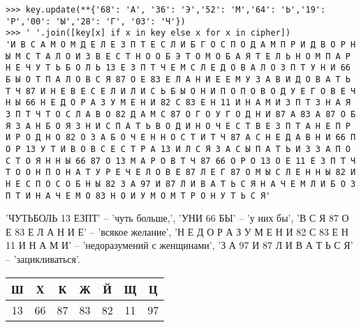\documentclass[letterpaper,11pt,openany]{book}
\begin{document}
\begin{lstlisting}
>>> key.update(**{'68': 'А', '36': 'Э','52': 'М','64': 'Ь','19': 'Р','00': 'Ы','28': 'Г', '03': 'Ч'})
>>> ' '.join([key[x] if x in key else x for x in cipher])
'И В С А М О М Д Е Л Е З П Т Е С Л И Б Г О С П О Д А М П Р И Д В О Р Н Ы М С Т А Л О И З В Е С Т Н О О Б Э Т О М О Б А Я Т Е Л Ь Н О М П А Р Н Е Ч У Т Ь Б О Л Ь 13 Е З П Т Ч Е М С Л Е Д О В А Л О З П Т У Н И 66 Б Ы О Т П А Л О В С Я 87 О Е 83 Е Л А Н И Е Е М У З А В И Д О В А Т Ь Т Ч 87 И Н Е В Е С Е Л И Л И С Ь Б Ы О Н И П О П О В О Д У Е Г О В Е Ч Н Ы 66 Н Е Д О Р А З У М Е Н И 82 С 83 Е Н 11 И Н А М И З П Т З Н А Я З П Т Ч Т О С Л А В О 82 Д А М С 87 О Г О У Г О Д Н И 87 А 83 А 87 О Б Я З А Н Б О Я З Н И С П А Т Ь В О Д И Н О Ч Е С Т В Е З П Т А Н Е П Р И Р О Д Н О 82 О З А Б О Ч Е Н Н О С Т И Т Ч 87 А С Н Е Д А В Н И 66 П О Р 13 У Т И В О В С Е С Т Р А 13 И Л С Я З А С Ы П А Т Ь И З З А П О С Т О Я Н Н Ы 66 87 О 13 М А Р О В Т Ч 87 66 О Р О 13 О Е 11 Е З П Т Ч Т О О Н П О Н А Т У Р Е Ч Е Л О В Е 87 Л Е Г 87 О М Ы С Л Е Н Н Ы 82 И Н Е С П О С О Б Н Ы 82 З А 97 И 87 Л И В А Т Ь С Я Н А Ч Е М Л И Б О З П Т И Н А Ч Е М О 83 Н О И У М О М Т Р О Н У Т Ь С Я'
\end{lstlisting}

'ЧУТЬБОЛЬ 13 ЕЗПТ' -- 'чуть больше,', 'УНИ 66 БЫ' -- 'у них бы', 'В С Я 87 О Е 83 Е Л А Н И Е' -- 'всякое желание', 'Н Е Д О Р А З У М Е Н И 82 С 83 Е Н 11 И Н А М И' -- 'недоразумений с женщинами', 'З А 97 И 87 Л И В А Т Ь С Я' -- 'зацикливаться'.

\medskip

{\centering
\begin{tabular}{||c|c|c|c|c|c|c||}
\hline
\textbf{Ш} & \textbf{Х} & \textbf{К} & \textbf{Ж} & \textbf{Й} & \textbf{Щ} & \textbf{Ц} \\
\hline
13 & 66 & 87 & 83 & 82 & 11 & 97 \\
\hline
\end{tabular}

}
\medskip
\end{document}
